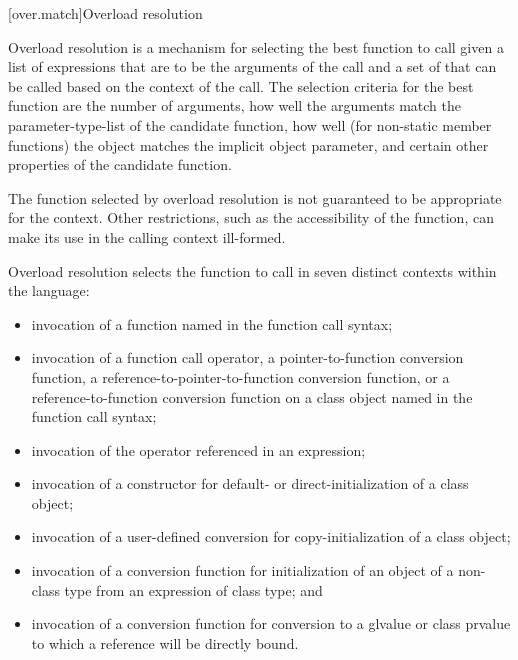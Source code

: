 [over.match]{Overload resolution}%
%
%

\pnum
Overload resolution is a mechanism for selecting the best
function to call given a list of expressions that are to be the
arguments of the call and a set of
that can
be called based on the context of the call.
The selection
criteria for the best function are the number of arguments, how
well the arguments match the parameter-type-list of the
candidate function,
how well (for non-static member functions) the object
matches the implicit object parameter,
and certain other properties of the candidate function.
\begin{note}
The function selected by overload resolution is not
guaranteed to be appropriate for the context.
Other restrictions,
such as the accessibility of the function, can make its use in
the calling context ill-formed.
\end{note}

\pnum
{}%
Overload resolution selects the function to call in seven distinct
contexts within the language:

\begin{itemize}
\item
invocation of a function named in the function call syntax;
\item
invocation of a function call operator, a pointer-to-function
conversion function, a reference-to-pointer-to-function conversion
function, or a reference-to-function
conversion function on a class object named in the function
call syntax;
\item
invocation of the operator referenced in an expression;
\item
invocation of a constructor for default- or direct-initialization
of a class object;
\item
invocation of a user-defined conversion for
copy-initialization of a class object;
\item
invocation of a conversion function for initialization of an object of a
non-class type from an expression of class type; and
\item
invocation of a conversion function for conversion to a glvalue
or class prvalue
to which a reference
will be directly bound.
\end{itemize}

